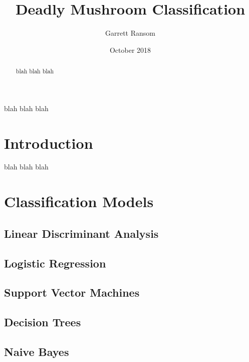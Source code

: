 \documentclass[11pt, letterpaper]{article}
\title{Deadly Mushroom Classification}
\author{Garrett Ransom}
\date{October 2018}
\begin{document}
	\maketitle
	\begin{abstract}
		\noindent
		blah blah blah
	\end{abstract}
blah blah blah

\section{Introduction}
blah blah blah

\section{Classification Models}

\subsection{Linear Discriminant Analysis}

\subsection{Logistic Regression}

\subsection{Support Vector Machines}

\subsection{Decision Trees}

\subsection{Naive Bayes}
\end{document}
